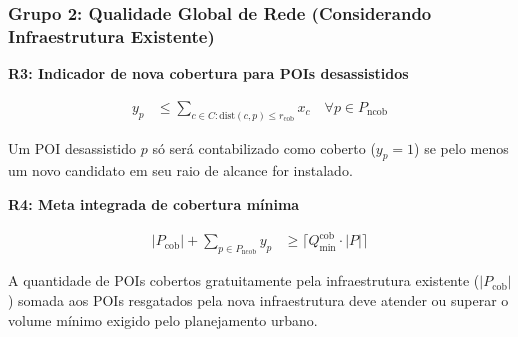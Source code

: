 \subsubsection{Grupo 2: Qualidade Global de Rede (Considerando Infraestrutura Existente)}

\hspace{0.5cm} \textbf{R3: Indicador de nova cobertura para POIs desassistidos}

\begin{align}
y_p &\leq \sum_{c \in C: \text{dist}(c,p) \leq r_{\text{cob}}} x_c \quad \forall p \in P_{\text{ncob}} \label{eq:cobertura_poi}
\end{align}

Um POI desassistido $p$ só será contabilizado como coberto ($y_p = 1$) se pelo menos um novo candidato em seu raio de alcance for instalado.

\hspace{0.5cm} \textbf{R4: Meta integrada de cobertura mínima}

\begin{align}
|P_{\text{cob}}| + \sum_{p \in P_{\text{ncob}}} y_p &\geq \lceil Q_{\min}^{\text{cob}} \cdot |P| \rceil \label{eq:meta_cobertura}
\end{align}

A quantidade de POIs cobertos gratuitamente pela infraestrutura existente ($|P_{\text{cob}}|$) somada aos POIs resgatados pela nova infraestrutura deve atender ou superar o volume mínimo exigido pelo planejamento urbano.